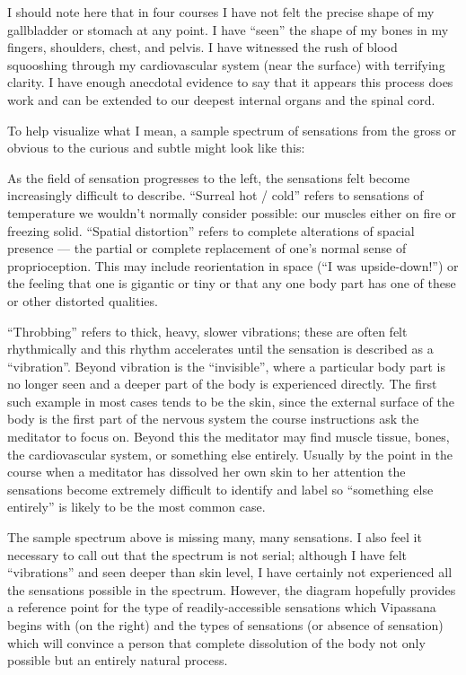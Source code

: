 \documentclass{article}
\begin{document}
I should note here that in four courses I have not felt the precise shape of my gallbladder or stomach at any point. I have ``seen'' the shape of my bones in my fingers, shoulders, chest, and pelvis. I have witnessed the rush of blood squooshing through my cardiovascular system (near the surface) with terrifying clarity. I have enough anecdotal evidence to say that it appears this process does work and can be extended to our deepest internal organs and the spinal cord.

To help visualize what I mean, a sample spectrum of sensations from the gross or obvious to the curious and subtle might look like this:

As the field of sensation progresses to the left, the sensations felt become increasingly difficult to describe. “Surreal hot / cold” refers to sensations of temperature we wouldn’t normally consider possible: our muscles either on fire or freezing solid. “Spatial distortion” refers to complete alterations of spacial presence — the partial or complete replacement of one’s normal sense of proprioception. This may include reorientation in space (“I was upside-down!”) or the feeling that one is gigantic or tiny or that any one body part has one of these or other distorted qualities.

“Throbbing” refers to thick, heavy, slower vibrations; these are often felt rhythmically and this rhythm accelerates until the sensation is described as a “vibration”. Beyond vibration is the “invisible”, where a particular body part is no longer seen and a deeper part of the body is experienced directly. The first such example in most cases tends to be the skin, since the external surface of the body is the first part of the nervous system the course instructions ask the meditator to focus on. Beyond this the meditator may find muscle tissue, bones, the cardiovascular system, or something else entirely. Usually by the point in the course when a meditator has dissolved her own skin to her attention the sensations become extremely difficult to identify and label so “something else entirely” is likely to be the most common case.

The sample spectrum above is missing many, many sensations. I also feel it necessary to call out that the spectrum is not serial; although I have felt “vibrations” and seen deeper than skin level, I have certainly not experienced all the sensations possible in the spectrum. However, the diagram hopefully provides a reference point for the type of readily-accessible sensations which Vipassana begins with (on the right) and the types of sensations (or absence of sensation) which will convince a person that complete dissolution of the body not only possible but an entirely natural process.
\end{document}
